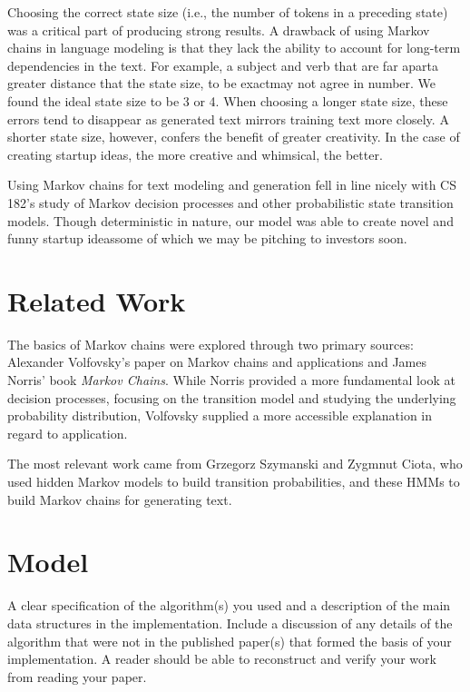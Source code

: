 \documentclass[11pt]{article}
\begin{document}
\begin{multicols}{2}
Choosing the correct state size (i.e., the number of tokens in a preceding state) was a critical part of producing strong results. A drawback of using Markov chains in language modeling is that they lack the ability to account for long-term dependencies in the text. For example, a subject and verb that are far apart\textemdash a greater distance that the state size, to be exact\textemdash may not agree in number. We found the ideal state size to be 3 or 4. When choosing a longer state size, these errors tend to disappear as generated text mirrors training text more closely. A shorter state size, however, confers the benefit of greater creativity. In the case of creating startup ideas, the more creative and whimsical, the better.

Using Markov chains for text modeling and generation fell in line nicely with CS 182's study of Markov decision processes and other probabilistic state transition models. Though deterministic in nature, our model was able to create novel and funny startup ideas\textemdash some of which we may be pitching to investors soon.

\section{Related Work}

The basics of Markov chains were explored through two primary sources: Alexander Volfovsky's paper on Markov chains and applications\cite{volfovsky2007} and James Norris' book \textit{Markov Chains}.\cite{norris1998} While Norris provided a more fundamental look at decision processes, focusing on the transition model and studying the underlying probability distribution, Volfovsky supplied a more accessible explanation in regard to application.

The most relevant work came from Grzegorz Szymanski and Zygmnut Ciota, who used hidden Markov models to build transition probabilities, and these HMMs to build Markov chains for generating text.\cite{szymanski2014}

\section{Model}

A clear specification of the algorithm(s) you used and a description
of the main data structures in the implementation. Include a
discussion of any details of the algorithm that were not in the
published paper(s) that formed the basis of your implementation. A
reader should be able to reconstruct and verify your work from reading
your paper.


\end{multicols}
\end{document}
